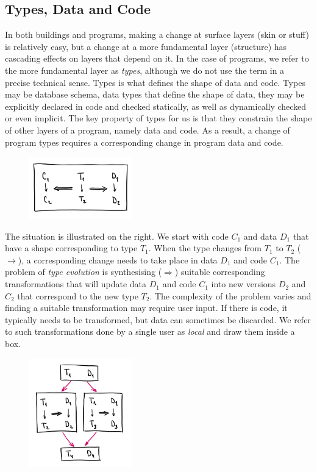\documentclass[english,submission]{programming}
\begin{document}
\subsection{Types, Data and Code}
In both buildings and programs, making a change at surface layers (skin or stuff) is relatively easy,
but a change at a more fundamental layer (structure) has cascading effects on layers that depend on it.
In the case of programs, we refer to the more fundamental layer as \emph{types}, although we do not
use the term in a precise technical sense. Types is what defines the shape of data and code.
Types may be database schema, data types that define the shape of data, they may be explicitly
declared in code and checked statically, as well as dynamically checked or even implicit.
The key property of types for us is that they constrain the shape of other layers
of a program, namely data and code. As a result, a change of program types requires a
corresponding change in program data and code.

\begin{figure}
\vspace{-1.5em}
\includegraphics[width=12em]{figures/arr-basic.png}
\vspace{-1.5em}
\end{figure}

The situation is illustrated on the right. We start with code $C_1$ and
data $D_1$ that have a shape corresponding to type $T_1$. When the type changes from $T_1$ to $T_2$ ($\rightarrow$),
a corresponding change needs to take place in data $D_1$ and code $C_1$. The problem
of \emph{type evolution} is synthesising ($\Rightarrow$) suitable corresponding transformations
that will update data $D_1$ and code $C_1$ into new versions $D_2$ and $C_2$ that correspond
to the new type $T_2$.
%
The complexity of the problem varies and finding a suitable transformation may require user
input. If there is code, it typically needs to be transformed, but data can sometimes be
discarded. We refer to such transformations done by a single user as \emph{local} and draw
them inside a box.

\begin{figure}
\vspace{-1.5em}
\includegraphics[width=12em]{figures/arr-forkjoin.png}
\vspace{-1.5em}
\end{figure}
\end{document}
